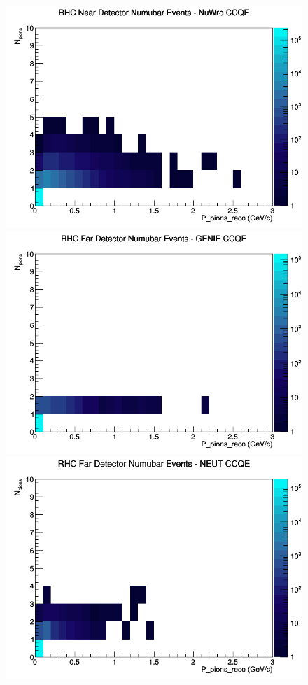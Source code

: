 \documentclass[12pt]{article}
\begin{document}
\begin{figure}[h]
\includegraphics[width=\linewidth]{eff_N_P/GAr/pions/CCQE_RHC_ND_numubar_N_P_NuWro.png}
\endminipage
\newline
{}
\includegraphics[width=\linewidth]{eff_N_P/GAr/pions/CCQE_RHC_FD_numubar_N_P_GENIE.png}
\endminipage
{}
\includegraphics[width=\linewidth]{eff_N_P/GAr/pions/CCQE_RHC_FD_numubar_N_P_NEUT.png}

\end{figure}
\end{document}
